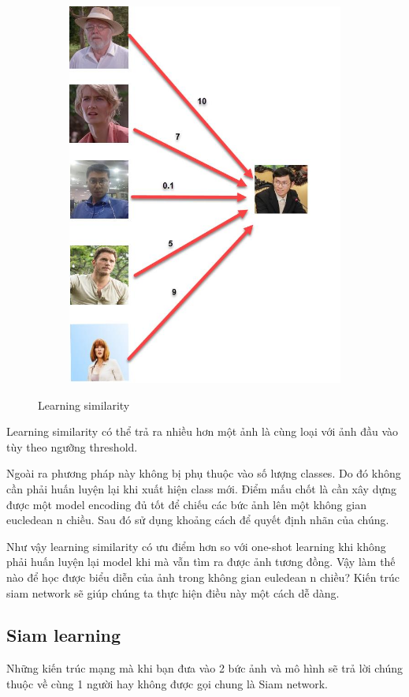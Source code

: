 \begin{figure}
    \begin{subfigure}{1.\textwidth}
        \begin{center}
            \includegraphics[width=0.5\linewidth]{Chapters/items/chap2_15.jpg}
        \end{center}
        \label{fig: chap2_15}
    \end{subfigure}
    \caption{Learning similarity}
\end{figure}

Learning similarity có thể trả ra nhiều hơn một ảnh là cùng loại với ảnh đầu vào tùy theo ngưỡng threshold.

Ngoài ra phương pháp này không bị phụ thuộc vào số lượng classes.
Do đó không cần phải huấn luyện lại khi xuất hiện class mới.
Điểm mấu chốt là cần xây dựng được một model encoding đủ tốt để chiếu các bức
ảnh lên một không gian eucledean n chiều. Sau đó sử dụng khoảng cách để quyết
định nhãn của chúng.

Như vậy learning similarity có ưu điểm hơn so với one-shot learning khi không phải
huấn luyện lại model khi mà vẫn tìm ra được ảnh tương đồng.
Vậy làm thế nào để học được biểu diễn của ảnh trong không gian euledean n chiều?
Kiến trúc siam network sẽ giúp chúng ta thực hiện điều này một cách dễ dàng.

\subsection{Siam learning}

Những kiến trúc mạng mà khi bạn đưa vào 2 bức ảnh và mô hình sẽ trả lời chúng thuộc về
cùng 1 người hay không được gọi chung là Siam network.


